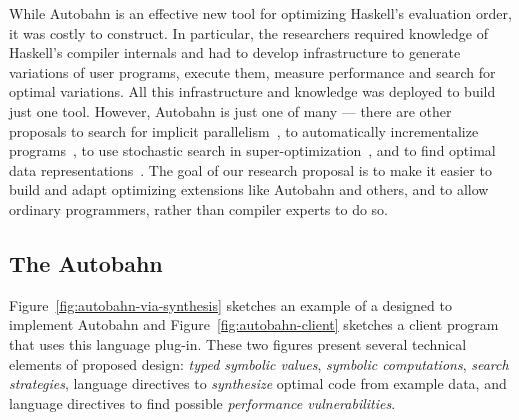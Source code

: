 While Autobahn is an effective new tool for optimizing Haskell's evaluation
order, it was costly to construct.  In particular, the researchers
required knowledge of Haskell's compiler internals and had to develop
infrastructure to generate variations of user programs, execute them,
measure performance and search for optimal variations.  All this
infrastructure and knowledge was deployed to build just one tool.
However, Autobahn is just one of many --- there are other proposals to
search for implicit parallelism~\cite{implicit-parallel}, to
automatically incrementalize
programs~\cite{type-directed-incrementalization}, to use stochastic search
in super-optimization~\cite{stochastic-superopt}, and to find optimal data
representations~\cite{data-rep-synth,conc-data-rep-synth}.  The goal of our research proposal
is to make it easier to build and adapt optimizing extensions like
Autobahn and others, and to allow ordinary programmers, rather than
compiler experts to do so.

\subsection{The Autobahn \rasp}
\label{sec:autobahn}

Figure~\ref{fig:autobahn-via-synthesis} sketches an example of a
\rasp{} designed to implement Autobahn and Figure~\ref{fig:autobahn-client} sketches a client program that uses this language plug-in.  These two
figures present
several technical elements of proposed design:  \emph{typed symbolic values},
\emph{symbolic computations}, \emph{search strategies}, language directives to
\emph{synthesize} optimal code from example data, and language directives to
find possible \emph{performance vulnerabilities}.

